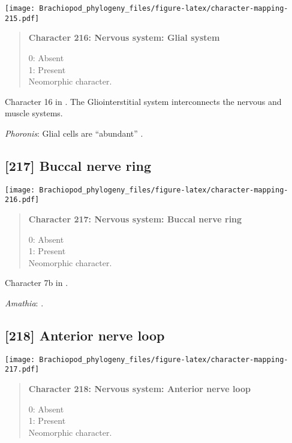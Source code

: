 \documentclass[openany]{book}
\theoremstyle{definition}
\theoremstyle{definition}
\theoremstyle{definition}
\theoremstyle{remark}
\begin{document}
\texttt{[image: Brachiopod\_phylogeny\_files/figure-latex/character-mapping-215.pdf]}

\begin{quote}
\textbf{Character 216: Nervous system: Glial system}

0: Absent\\
1: Present\\
Neomorphic character.
\end{quote}

Character 16 in \citet{Haszprunar1996}. The Gliointerstitial system
interconnects the nervous and muscle systems.

\hypertarget{Phoronis-coding-216}{}
\emph{Phoronis}: Glial cells are ``abundant''
\citep{Temereva2016Phoronida}.

\subsection*{{[}217{]} Buccal nerve ring}\label{buccal-nerve-ring}

\texttt{[image: Brachiopod\_phylogeny\_files/figure-latex/character-mapping-216.pdf]}

\begin{quote}
\textbf{Character 217: Nervous system: Buccal nerve ring}

0: Absent\\
1: Present\\
Neomorphic character.
\end{quote}

Character 7b in \citet{Haszprunar2008}.

\hypertarget{Amathia-coding-217}{}
\emph{Amathia}: \citet{Temereva2016Thenervous}.

\subsection*{{[}218{]} Anterior nerve loop}\label{anterior-nerve-loop}

\texttt{[image: Brachiopod\_phylogeny\_files/figure-latex/character-mapping-217.pdf]}

\begin{quote}
\textbf{Character 218: Nervous system: Anterior nerve loop}

0: Absent\\
1: Present\\
Neomorphic character.
\end{quote}
\end{document}
